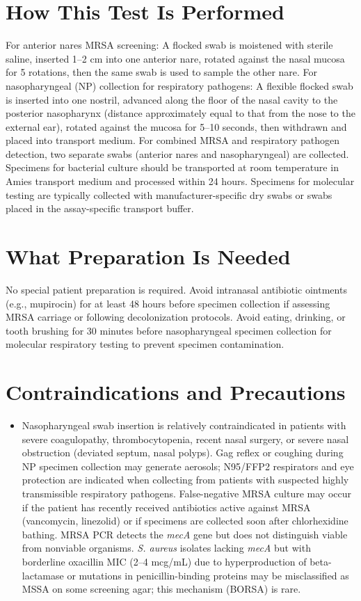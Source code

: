 \section*{How This Test Is Performed}
For anterior nares MRSA screening: A flocked swab is moistened with sterile saline, inserted 1--2 cm into one anterior nare, rotated against the nasal mucosa for 5 rotations, then the same swab is used to sample the other nare. For nasopharyngeal (NP) collection for respiratory pathogens: A flexible flocked swab is inserted into one nostril, advanced along the floor of the nasal cavity to the posterior nasopharynx (distance approximately equal to that from the nose to the external ear), rotated against the mucosa for 5--10 seconds, then withdrawn and placed into transport medium. For combined MRSA and respiratory pathogen detection, two separate swabs (anterior nares and nasopharyngeal) are collected. Specimens for bacterial culture should be transported at room temperature in Amies transport medium and processed within 24 hours. Specimens for molecular testing are typically collected with manufacturer-specific dry swabs or swabs placed in the assay-specific transport buffer.

\section*{What Preparation Is Needed}
No special patient preparation is required. Avoid intranasal antibiotic ointments (e.g., mupirocin) for at least 48 hours before specimen collection if assessing MRSA carriage or following decolonization protocols. Avoid eating, drinking, or tooth brushing for 30 minutes before nasopharyngeal specimen collection for molecular respiratory testing to prevent specimen contamination.

\section*{Contraindications and Precautions}
\begin{itemize}
  \item Nasopharyngeal swab insertion is relatively contraindicated in patients with severe coagulopathy, thrombocytopenia, recent nasal surgery, or severe nasal obstruction (deviated septum, nasal polyps). Gag reflex or coughing during NP specimen collection may generate aerosols; N95/FFP2 respirators and eye protection are indicated when collecting from patients with suspected highly transmissible respiratory pathogens. False-negative MRSA culture may occur if the patient has recently received antibiotics active against MRSA (vancomycin, linezolid) or if specimens are collected soon after chlorhexidine bathing. MRSA PCR detects the \textit{mecA} gene but does not distinguish viable from nonviable organisms. \textit{S. aureus} isolates lacking \textit{mecA} but with borderline oxacillin MIC (2--4 mcg/mL) due to hyperproduction of beta-lactamase or mutations in penicillin-binding proteins may be misclassified as MSSA on some screening agar; this mechanism (BORSA) is rare.
\end{itemize}
